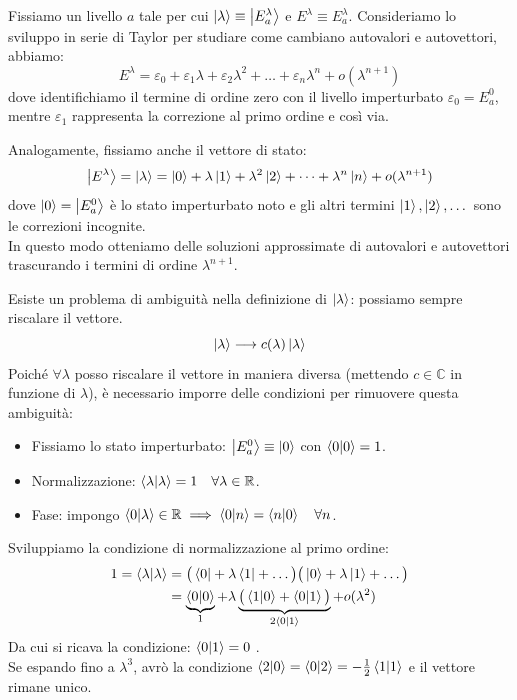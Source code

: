 Fissiamo un livello \( a \) tale per cui \( \ket{\lambda} \equiv \ket{E_a^\lambda} \) e \( E^\lambda \equiv E_a^\lambda \).
Consideriamo lo sviluppo in serie di Taylor per studiare come cambiano autovalori e autovettori, abbiamo:
\begin{equation}
    E^\lambda = \varepsilon_0 + \varepsilon_1 \lambda + \varepsilon_2 \lambda^2 + \dots + \varepsilon_n \lambda^n + o(\lambda^{n+1})
\end{equation}
dove identifichiamo il termine di ordine zero con il livello imperturbato \( \varepsilon_0 = E_a^0 \), mentre \(\varepsilon_1 \) rappresenta la correzione al primo ordine e così via.

Analogamente, fissiamo anche il vettore di stato:
\begin{equation}
    \ket{E^\lambda} = \ket{\lambda} = \ket{0} + \lambda \ket{1} + \lambda^2 \ket{2} + \dots + \lambda^n \ket{n} + o(\lambda^{n+1})
\end{equation}
dove \( \ket{0} = \ket{E_a^0} \) è lo stato imperturbato noto e gli altri termini \( \ket{1}, \ket{2}, \dots \) sono le correzioni incognite.\\
In questo modo otteniamo delle soluzioni approssimate di autovalori e autovettori trascurando i termini di ordine \( \lambda^{n+1} \).

\begin{attention}
    Esiste un problema di ambiguità nella definizione di \( \ket{\lambda} \): possiamo sempre riscalare il vettore.
    \[
        \ket{\lambda} \longrightarrow c(\lambda) \ket{\lambda}
    \]
    Poiché \( \forall \lambda \) posso riscalare il vettore in maniera diversa (mettendo \( c \in \mathbb{C} \) in funzione di \( \lambda \)), è necessario imporre delle condizioni per rimuovere questa ambiguità:
    \begin{itemize}
        \item Fissiamo lo stato imperturbato: \( \ket{E_a^0} \equiv \ket{0} \) con \( \braket{0}{0}=1 \).
        \item Normalizzazione: \( \braket{\lambda}{\lambda} = 1 \quad \forall \lambda \in \mathbb{R} \).
        \item Fase: impongo \( \braket{0}{\lambda} \in \mathbb{R} \implies \braket{0}{n} = \braket{n}{0} \quad \forall n \).
    \end{itemize}

    Sviluppiamo la condizione di normalizzazione al primo ordine:
    \begin{align*}
        1 = \braket{\lambda}{\lambda} &= \big( \bra{0} + \lambda \bra{1} + \dots \big) \big( \ket{0} + \lambda \ket{1} + \dots \big) \\
        &= \underbrace{\braket{0}{0}}_{1} + \lambda \underbrace{\big( \braket{1}{0} + \braket{0}{1} \big)}_{2\braket{0}{1}} + o(\lambda^2)
    \end{align*}
    Da cui si ricava la condizione: \(\braket{0}{1} = 0\) .\\
    Se espando fino a \(\lambda^3\), avrò la condizione \(\braket{2}{0}= \braket{0}{2}= - \frac{1}{2}\braket{1}{1}\) e il vettore rimane unico.
\end{attention}

